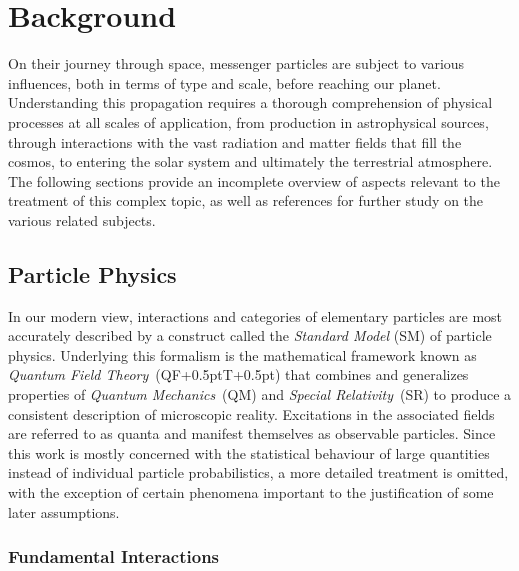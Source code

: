 \let\backupskip\chapterheadstartvskip
\renewcommand*\chapterheadstartvskip{\vspace*{3\topskip}} 
\chapter{Background}
\label{ch:background}
\let\chapterheadstartvskip\backupskip

On their journey through space, messenger particles are subject to various influences, both in terms of type and scale,
before reaching our planet. Understanding this propagation requires a thorough comprehension of physical processes at all
scales of application, from production in astrophysical sources, through interactions with the vast radiation and matter
fields that fill the cosmos, to entering the solar system and ultimately the terrestrial atmosphere. The following sections
provide an incomplete overview of aspects relevant to the treatment of this complex topic, as well as references for further
study on the various related subjects.



\section{Particle Physics}
\label{sec:particle}

In our modern view, interactions and categories of elementary particles are most accurately described by a construct called the
\emph{Standard Model} (SM) of particle physics. Underlying this formalism is the mathematical framework known as
\emph{Quantum Field Theory}~(QF{\kern+0.5pt}T{\kern+0.5pt}) that combines and generalizes properties of
\emph{Quantum Mechanics}~(QM) and \emph{Special Relativity}~(SR) to produce a consistent description of microscopic reality.
Excitations in the associated fields are referred to as quanta and manifest themselves as observable particles.
Since this work is mostly concerned with the statistical behaviour of large quantities instead of individual particle probabilistics,
a more detailed treatment is omitted, with the exception of certain phenomena important to the justification of some later assumptions.



\subsection{Fundamental Interactions}
\label{sub:interactions}

